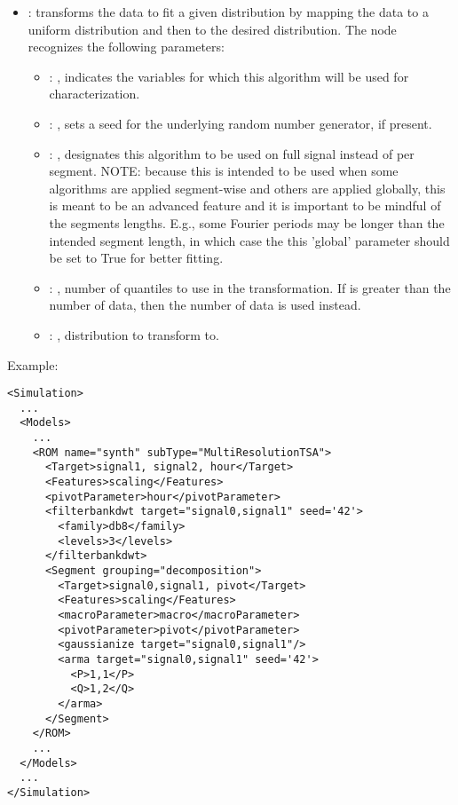 \begin{itemize}
    \item {}:
      transforms the data to fit a given distribution by mapping the data to     a uniform
      distribution and then to the desired distribution.
      The  node recognizes the following parameters:
        \begin{itemize}
          \item {}: , 
            indicates the variables for which this algorithm will be used for characterization.
          \item {}: , 
            sets a seed for the underlying random number generator, if present.
          \item {}: , 
            designates this algorithm to be used on full signal instead of per
            segment. NOTE: because this is intended to be used when some algorithms are
            applied segment-wise and others are applied globally, this is meant to be an
            advanced feature and it is important to be mindful of the segments lengths.
            E.g., some Fourier periods may be longer than the intended segment length, in
            which case the this 'global' parameter should be set to True for better
            fitting. 
          \item {}: , 
            number of quantiles to use in the transformation. If 
            is greater than the number of data, then the number of data is used instead. 
          \item {}: , 
            distribution to transform to. 
      \end{itemize}
  \end{itemize}

\hspace{24pt}
Example:
\begin{lstlisting}[style=XML,morekeywords={name,subType,pivotLength,shift,target,threshold,period,width}]
<Simulation>
  ...
  <Models>
    ...
    <ROM name="synth" subType="MultiResolutionTSA">
      <Target>signal1, signal2, hour</Target>
      <Features>scaling</Features>
      <pivotParameter>hour</pivotParameter>
      <filterbankdwt target="signal0,signal1" seed='42'>
        <family>db8</family>
        <levels>3</levels>
      </filterbankdwt>
      <Segment grouping="decomposition">
        <Target>signal0,signal1, pivot</Target>
        <Features>scaling</Features>
        <macroParameter>macro</macroParameter>
        <pivotParameter>pivot</pivotParameter>
        <gaussianize target="signal0,signal1"/>
        <arma target="signal0,signal1" seed='42'>
          <P>1,1</P>
          <Q>1,2</Q>
        </arma>
      </Segment>
    </ROM>
    ...
  </Models>
  ...
</Simulation>
\end{lstlisting}


